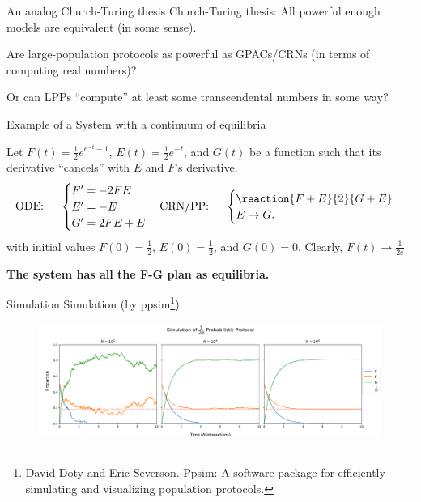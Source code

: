 \documentclass[aspectratio=169]{beamer}
\begin{document}
\begin{frame}{An analog Church-Turing thesis}%
Church-Turing thesis: All powerful enough models are equivalent (in some sense).
\begin{quest}
    Are large-population protocols as powerful as GPACs/CRNs (in terms of computing real numbers)?
\end{quest}
Or can LPPs ``compute'' at least some transcendental numbers in some way?
\end{frame}

\begin{frame}{Example of a System with a continuum of equilibria}
\begin{example}
   Let $F(t)= \frac{1}{2}e^{e^{-t} -1}$, $E(t)= \frac{1}{2}e^{-t}$, and $G(t)$ be a function such that its derivative ``cancels'' with $E$ and $F$'s derivative.
\begin{equation*}
\text{ODE:}\hspace{0.5cm}
       \begin{cases}
        F'= -2FE\\
        E'= -E \\
        G'= 2FE + E
   \end{cases}
\text{CRN/PP:} \hspace{0.5 cm}
\begin{cases}
    \reaction{F + E}{2}{G+E}\\
    E \to G.
   \end{cases}
\end{equation*}
with initial values $F(0)=\frac{1}{2}$, $E(0)=\frac{1}{2}$, and $G(0)=0$. Clearly, $F(t)\to \frac{1}{2e}$
\end{example}
\textbf{The system has all the F-G plan as equilibria.}
\end{frame}


\begin{frame}[Clean]{Simulation}
    Simulation (by ppsim\footnote{David Doty and Eric Severson. Ppsim: A software package for efficiently
simulating and visualizing population protocols.})
\begin{figure}[tb]
    \centering
    \includegraphics[scale=0.3]{half_e}
\end{figure}
\end{frame}
\end{document}
